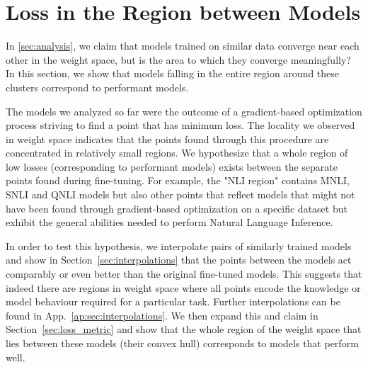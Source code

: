 \documentclass[nohyperref]{article}
\theoremstyle{plain}
\theoremstyle{definition}
\theoremstyle{remark}
\begin{document}
\section{Loss in the Region between Models}

In \ref{sec:analysis}, we claim that models trained on similar data converge near each other in the weight space, but is the area to which they converge meaningfully? In this section, we show that models falling in the entire region around these clusters correspond to performant models.

The models we analyzed so far were the outcome of a gradient-based optimization process striving to find a point that has minimum loss. The locality we observed in weight space indicates that the points found through this procedure are concentrated in relatively small regions.
We hypothesize that a whole region of low losses (corresponding to performant models) exists between the separate points found during fine-tuning. For example, the "NLI region" contains MNLI, SNLI and QNLI models but also other points that reflect models that might not have been found through gradient-based optimization on a specific dataset but exhibit the general abilities needed to perform Natural Language Inference.

In order to test this hypothesis, we interpolate pairs of similarly trained models and show in Section~\ref{sec:interpolations} that the points between the models act comparably or even better than the original fine-tuned models. This suggests that indeed there are regions in weight space where all points encode the knowledge or model behaviour required for a particular task. Further interpolations can be found in App.~\ref{ap:sec:interpolations}.
We then expand this and claim in Section~\ref{sec:loss_metric} and show that the whole region of the weight space that lies between these models (their convex hull) corresponds to models that perform well.
\end{document}
